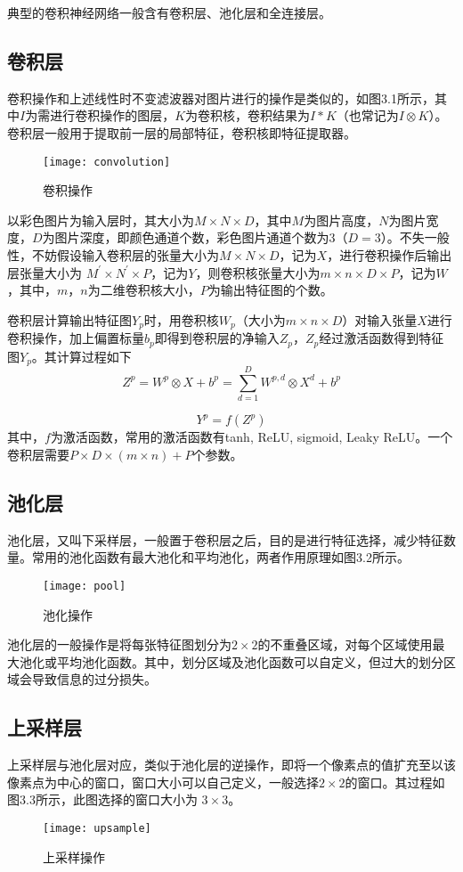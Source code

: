 \documentclass[a4paper, 12pt, oneside]{report}
\begin{document}
{典型的卷积神经网络一般含有卷积层、池化层和全连接层。

\subsection{卷积层\quad}
卷积操作和上述线性时不变滤波器对图片进行的操作是类似的，{\Large 如图3.1所示}，其中$I$为需进行卷积操作的图层，$K$为卷积核，卷积结果为$I\ast K$（也常记为$I\otimes K$）。卷积层一般用于提取前一层的局部特征，卷积核即特征提取器。
\begin{figure}[H]
\centering
\texttt{[image: convolution]}
\caption{卷积操作}
\end{figure}
以彩色图片为输入层时，其大小为$M \times N \times D$，其中$M$为图片高度，$N$为图片宽度，$D$为图片深度，即颜色通道个数，彩色图片通道个数为3（$D = 3$）。不失一般性，不妨假设输入卷积层的张量大小为$M \times N \times D$，记为$X$，进行卷积操作后输出层张量大小为 $M^{\prime} \times N^{\prime} \times P$，记为$Y$，则卷积核张量大小为$m \times n \times D \times P$，记为$W$，其中，$m$，$n$为二维卷积核大小，$P$为输出特征图的个数。

卷积层计算输出特征图$Y_p$时，用卷积核$W_p$（大小为$m \times n \times D$）对输入张量$X$进行卷积操作，加上偏置标量$b_p$即得到卷积层的净输入$Z_p$，$Z_p$经过激活函数得到特征图$Y_p$。其计算过程如下
\begin{equation}
Z^p = W^p \otimes X + b^p = \sum_{d = 1}^D W^{p, d} \otimes X^d + b^p
\end{equation}

\begin{equation}
Y^p = f(Z^p)
\end{equation}
其中，$f$为激活函数，常用的激活函数有tanh, ReLU, sigmoid, Leaky ReLU。一个卷积层需要$P \times D \times (m \times n) + P$个参数。

\subsection{池化层\quad}
池化层，又叫下采样层，一般置于卷积层之后，目的是进行特征选择，减少特征数量。常用的池化函数有最大池化和平均池化，两者作用原理如图3.2所示。
\begin{figure}[h]
\centering
\texttt{[image: pool]}
\caption{池化操作}
\end{figure}
池化层的一般操作是将每张特征图划分为$2\times 2$的不重叠区域，对每个区域使用最大池化或平均池化函数。其中，划分区域及池化函数可以自定义，但过大的划分区域会导致信息的过分损失。

\subsection{上采样层\quad}
上采样层与池化层对应，类似于池化层的逆操作，即将一个像素点的值扩充至以该像素点为中心的窗口，窗口大小可以自己定义，一般选择$2\times 2$的窗口。其过程如图3.3所示，此图选择的窗口大小为 $3 \times 3$。
\begin{figure}[h]
\centering
\texttt{[image: upsample]}
\caption{上采样操作}
\end{figure}

}
\end{document}
